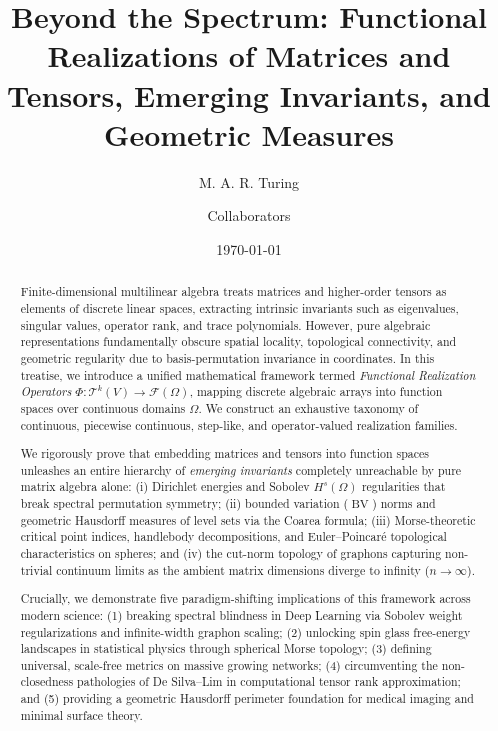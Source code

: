 \documentclass[11pt,a4paper,reqno]{amsart}
\title[Beyond the Spectrum]{Beyond the Spectrum: Functional Realizations of Matrices and Tensors, Emerging Invariants, and Geometric Measures}
\author{M. A. R. Turing \and Collaborators}
\date{\today}
\theoremstyle{definition}
\numberwithin{equation}{section}
\newcommand{\BV}{\operatorname{BV}}
\begin{document}
\begin{abstract}
Finite-dimensional multilinear algebra treats matrices and higher-order tensors as elements of discrete linear spaces, extracting intrinsic invariants such as eigenvalues, singular values, operator rank, and trace polynomials. However, pure algebraic representations fundamentally obscure spatial locality, topological connectivity, and geometric regularity due to basis-permutation invariance in coordinates. In this treatise, we introduce a unified mathematical framework termed \emph{Functional Realization Operators} $\Phi \colon \mathcal{T}^k(V) \to \mathcal{F}(\Omega)$, mapping discrete algebraic arrays into function spaces over continuous domains $\Omega$. We construct an exhaustive taxonomy of continuous, piecewise continuous, step-like, and operator-valued realization families. 

We rigorously prove that embedding matrices and tensors into function spaces unleashes an entire hierarchy of \emph{emerging invariants} completely unreachable by pure matrix algebra alone: (i) Dirichlet energies and Sobolev $H^s(\Omega)$ regularities that break spectral permutation symmetry; (ii) bounded variation ($\BV$) norms and geometric Hausdorff measures of level sets via the Coarea formula; (iii) Morse-theoretic critical point indices, handlebody decompositions, and Euler--Poincar\'e topological characteristics on spheres; and (iv) the cut-norm topology of graphons capturing non-trivial continuum limits as the ambient matrix dimensions diverge to infinity ($n \to \infty$). 

Crucially, we demonstrate five paradigm-shifting implications of this framework across modern science: (1) breaking spectral blindness in Deep Learning via Sobolev weight regularizations and infinite-width graphon scaling; (2) unlocking spin glass free-energy landscapes in statistical physics through spherical Morse topology; (3) defining universal, scale-free metrics on massive growing networks; (4) circumventing the non-closedness pathologies of De Silva--Lim in computational tensor rank approximation; and (5) providing a geometric Hausdorff perimeter foundation for medical imaging and minimal surface theory.
\end{abstract}

\end{document}

